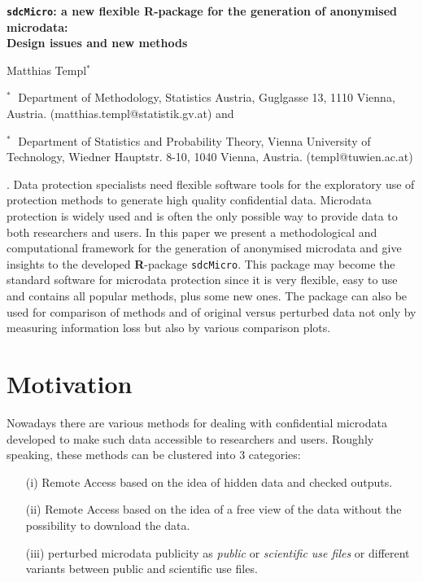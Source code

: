 \documentclass[12pt]{article}
\begin{document}
\begin{flushleft}
  {\LARGE\bf {\tt sdcMicro}: a new flexible {\bf R}-package for the generation of anonymised microdata:  \\[2mm]Design issues and new methods } 
  \vspace{1.0cm}
  
  Matthias Templ$^*$%
 
{\small
\begin{description}
\item $^* \;$ Department of Methodology, Statistics Austria, Guglgasse 13, 1110 Vienna, Austria.
    (matthias.templ@statistik.gv.at) and \\
\item $^{*}\;$    Department of Statistics and Probability Theory, Vienna University of Technology, Wiedner Hauptstr. 8-10, 1040 Vienna, Austria. 
    (templ@tuwien.ac.at)
\end{description}
}
\end{flushleft}
\vspace{1cm}


.
{\small Data protection specialists need flexible software tools for the exploratory use of protection methods to generate high quality confidential data. Microdata protection is widely used and is often the only possible way to provide data to both researchers and users. In this paper we present a methodological and computational framework for the generation of anonymised microdata and give insights to the developed {\bf R}-package {\tt sdcMicro}. This package may become the standard software for microdata protection since it is very flexible, easy to use and contains all popular methods, plus some new ones. The package can also be used for comparison of methods and of original versus perturbed data not only by measuring information loss but also by various comparison plots.
}

\section{Motivation}
Nowadays there are various methods for dealing with confidential microdata developed to make such data accessible to researchers and users.
Roughly speaking, these methods can be clustered into 3 categories: 
\begin{itemize}
  \item[(i)] Remote Access based on the idea of hidden data and checked outputs.
  \item[(ii)] Remote Access based on the idea of a free view of the data without the possibility to download the data.
  \item[(iii)] perturbed microdata publicity as {\it public} or {\it scientific use files} or different variants between public and scientific use files.
\end{itemize}
\end{document}
